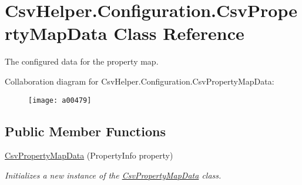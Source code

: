 \hypertarget{a00063}{\section{Csv\-Helper.\-Configuration.\-Csv\-Property\-Map\-Data Class Reference}
\label{a00063}
}


The configured data for the property map.  




Collaboration diagram for Csv\-Helper.\-Configuration.\-Csv\-Property\-Map\-Data\-:
\nopagebreak
\begin{figure}[H]
\begin{center}
\leavevmode
\texttt{[image: a00479]}
\end{center}
\end{figure}
\subsection*{Public Member Functions}
\begin{DoxyCompactItemize}
\item 
\hyperlink{a00063_a1a1424683bea80f373e3ea80ae6e39c7}{Csv\-Property\-Map\-Data} (Property\-Info property)
\begin{DoxyCompactList}\small\item\em Initializes a new instance of the \hyperlink{a00063}{Csv\-Property\-Map\-Data} class. \end{DoxyCompactList}\end{DoxyCompactItemize}
